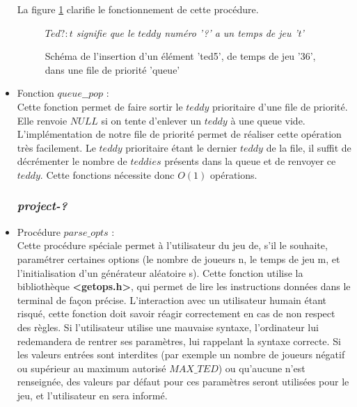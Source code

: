 \documentclass{article}
\begin{document}
\begin{itemize}
    La figure \ref{fig:push} clarifie le fonctionnement de cette procédure. 
    \begin{figure}[h]
        \centering
        \caption{Schéma de l'insertion d'un élément 'ted5', de temps de jeu '36', dans une file de priorité 'queue'}
        \textit{$Ted?: t$ signifie que le $teddy$ numéro '?' a un temps de jeu 't'}
        \label{fig:push}
    \end{figure}
    
    
    \item Fonction $queue\_\_pop$ :\\
    Cette fonction permet de faire sortir le $teddy$ prioritaire d'une file de priorité. Elle renvoie $NULL$ si on tente d'enlever un $teddy$ à une queue vide. L'implémentation de notre file de priorité permet de réaliser cette opération très facilement. Le $teddy$ prioritaire étant le dernier $teddy$ de la file, il suffit de décrémenter le nombre de $teddies$ présents dans la queue et de renvoyer ce $teddy$. Cette fonctions nécessite donc $O(1)$ opérations.  \\
   
   \subsubsection{\textit{project-?}}
 
    \item Procédure $parse\_opts$ :\\
    Cette procédure spéciale permet à l'utilisateur du jeu de, s'il le souhaite, paramétrer certaines options (le nombre de joueurs n, le temps de jeu m, et l'initialisation d'un générateur aléatoire s). Cette fonction utilise la bibliothèque \textbf{<getops.h>}, qui permet de lire les instructions données dans le terminal de façon précise. L'interaction avec un utilisateur humain étant risqué, cette fonction doit savoir réagir correctement en cas de non respect des règles. Si l'utilisateur utilise une mauvaise syntaxe, l'ordinateur lui redemandera de rentrer ses paramètres, lui rappelant la syntaxe correcte. Si les valeurs entrées sont interdites (par exemple un nombre de joueurs négatif ou supérieur au maximum autorisé $MAX\_TED$) ou qu'aucune n'est renseignée, des valeurs par défaut pour ces paramètres seront utilisées pour le jeu, et l'utilisateur en sera informé. 
\end{itemize}
\end{document}
